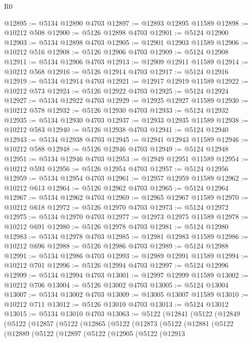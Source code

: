 \begin{lexlean}{R0}
\begin{coremodule}
@12895 := @5134 @12890 @4703
@12897 := @12893 @12895 @11589
@12898 := @10212 @508
@12900 := @5126 @12898 @4703
@12901 := @5124 @12900
@12903 := @5134 @12898 @4703
@12905 := @12901 @12903 @11589
@12906 := @10212 @516
@12908 := @5126 @12906 @4703
@12909 := @5124 @12908
@12911 := @5134 @12906 @4703
@12913 := @12909 @12911 @11589
@12914 := @10212 @568
@12916 := @5126 @12914 @4703
@12917 := @5124 @12916
@12919 := @5134 @12914 @4703
@12921 := @12917 @12919 @11589
@12922 := @10212 @573
@12924 := @5126 @12922 @4703
@12925 := @5124 @12924
@12927 := @5134 @12922 @4703
@12929 := @12925 @12927 @11589
@12930 := @10212 @578
@12932 := @5126 @12930 @4703
@12933 := @5124 @12932
@12935 := @5134 @12930 @4703
@12937 := @12933 @12935 @11589
@12938 := @10212 @583
@12940 := @5126 @12938 @4703
@12941 := @5124 @12940
@12943 := @5134 @12938 @4703
@12945 := @12941 @12943 @11589
@12946 := @10212 @588
@12948 := @5126 @12946 @4703
@12949 := @5124 @12948
@12951 := @5134 @12946 @4703
@12953 := @12949 @12951 @11589
@12954 := @10212 @593
@12956 := @5126 @12954 @4703
@12957 := @5124 @12956
@12959 := @5134 @12954 @4703
@12961 := @12957 @12959 @11589
@12962 := @10212 @613
@12964 := @5126 @12962 @4703
@12965 := @5124 @12964
@12967 := @5134 @12962 @4703
@12969 := @12965 @12967 @11589
@12970 := @10212 @618
@12972 := @5126 @12970 @4703
@12973 := @5124 @12972
@12975 := @5134 @12970 @4703
@12977 := @12973 @12975 @11589
@12978 := @10212 @691
@12980 := @5126 @12978 @4703
@12981 := @5124 @12980
@12983 := @5134 @12978 @4703
@12985 := @12981 @12983 @11589
@12986 := @10212 @696
@12988 := @5126 @12986 @4703
@12989 := @5124 @12988
@12991 := @5134 @12986 @4703
@12993 := @12989 @12991 @11589
@12994 := @10212 @701
@12996 := @5126 @12994 @4703
@12997 := @5124 @12996
@12999 := @5134 @12994 @4703
@13001 := @12997 @12999 @11589
@13002 := @10212 @706
@13004 := @5126 @13002 @4703
@13005 := @5124 @13004
@13007 := @5134 @13002 @4703
@13009 := @13005 @13007 @11589
@13010 := @10212 @711
@13012 := @5126 @13010 @4703
@13013 := @5124 @13012
@13015 := @5134 @13010 @4703
@13063 := @5122
    (@12841
      (@5122
        (@12849
          (@5122
            (@12857
              (@5122
                (@12865
                  (@5122
                    (@12873
                      (@5122
                        (@12881
                          (@5122
                            (@12889
                              (@5122
                                (@12897
                                  (@5122
                                    (@12905
                                      (@5122
                                        (@12913

\end{coremodule}
\end{lexlean}
